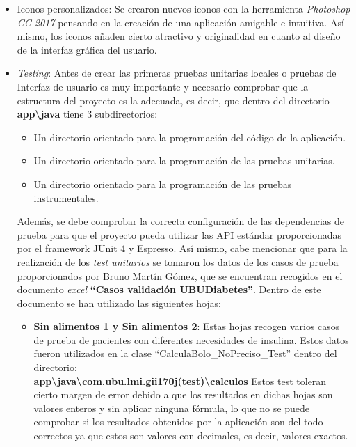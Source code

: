 \begin{itemize}
	\item Iconos personalizados: Se crearon nuevos iconos con la herramienta \textit{Photoshop CC 2017} pensando en la creación de una aplicación amigable e intuitiva. Así mismo, los iconos añaden cierto atractivo y originalidad en cuanto al diseño de la interfaz gráfica del usuario.
	\item \textit{Testing}: Antes de crear las primeras pruebas unitarias locales o pruebas de Interfaz de usuario es muy importante y necesario comprobar que la estructura del proyecto es la adecuada, es decir, que dentro del directorio \textbf{app\textbackslash{java}} tiene 3 subdirectorios:
	\begin{itemize}
		\item Un directorio orientado para la programación del código de la aplicación.
		\item Un directorio orientado para la programación de las pruebas unitarias.
		\item Un directorio orientado para la programación de las pruebas instrumentales.
	\end{itemize}
Además, se debe comprobar la correcta configuración de las dependencias de prueba para que el proyecto pueda utilizar las API estándar proporcionadas por el framework JUnit 4 y Espresso.
Así mismo, cabe mencionar que para la realización de los \textit{test unitarios} se tomaron los datos de los casos de prueba proporcionados por Bruno Martín Gómez, que se encuentran recogidos en el documento \textit{excel} \textbf{``Casos validación UBUDiabetes''}. Dentro de este documento se han utilizado las siguientes hojas:
\begin{itemize}
	\item \textbf{Sin alimentos 1 y Sin alimentos 2}: Estas hojas recogen varios casos de prueba de pacientes con diferentes necesidades de insulina. Estos datos fueron utilizados en la clase ``CalculaBolo\_NoPreciso\_Test'' dentro del directorio: \\ \textbf{app\textbackslash{java}\textbackslash{com.ubu.lmi.gii170j(test)}\textbackslash{calculos}}
	Estos test toleran cierto margen de error debido a que los resultados en dichas hojas son valores enteros y sin aplicar ninguna fórmula, lo que no se puede comprobar si los resultados obtenidos por la aplicación son del todo correctos ya que estos son valores con decimales, es decir, valores exactos.

\end{itemize}
\end{itemize}
